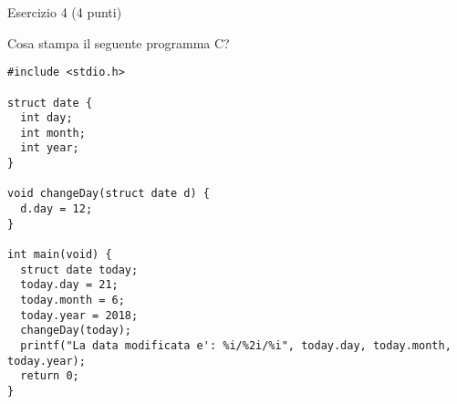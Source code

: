 \documentclass[12pt]{article}
\begin{document}
\vspace*{1ex}

\begin{center}
{\Large Esercizio 4} (4 punti)
\end{center}

\noindent Cosa stampa il seguente programma C?

\begin{lstlisting}
#include <stdio.h>
 
struct date {
  int day;
  int month;
  int year;
}

void changeDay(struct date d) {
  d.day = 12;  
}
 
int main(void) {
  struct date today;
  today.day = 21;
  today.month = 6;
  today.year = 2018;  
  changeDay(today);
  printf("La data modificata e': %i/%2i/%i", today.day, today.month, today.year);
  return 0;
}
\end{lstlisting}
\end{document}
